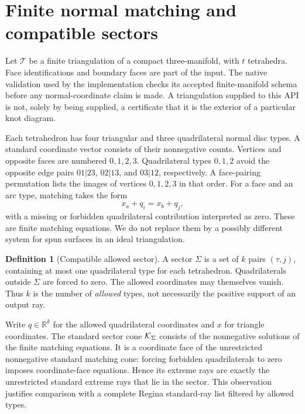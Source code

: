 \documentclass[11pt]{article}
\theoremstyle{definition}
\newtheorem{definition}[theorem]{Definition}
\theoremstyle{remark}
\newcommand{\R}{\mathbb R}\newcommand{\Q}{\mathbb Q}
\begin{document}
\section{Finite normal matching and compatible sectors}
\label{sec:setting}

Let $\mathcal T$ be a finite triangulation of a compact three-manifold, with
$t$ tetrahedra. Face identifications and boundary faces are part of the input.
The native validation used by the implementation checks its accepted
finite-manifold schema before any normal-coordinate claim is made. A
triangulation supplied to this API is not, solely by being supplied, a
certificate that it is the exterior of a particular knot diagram.

Each tetrahedron has four triangular and three quadrilateral normal disc
types. A standard coordinate vector consists of their nonnegative counts.
Vertices and opposite faces are numbered $0,1,2,3$. Quadrilateral types
$0,1,2$ avoid the opposite edge pairs $01|23$, $02|13$, and $03|12$,
respectively. A face-pairing permutation lists the images of vertices
$0,1,2,3$ in that order.
For a face and an arc type, matching takes the form
\begin{equation}
 x_a+q_i=x_b+q_j,
 \label{eq:matching}
\end{equation}
with a missing or forbidden quadrilateral contribution interpreted as zero.
These are finite matching equations. We do not replace them by a possibly
different system for spun surfaces in an ideal triangulation.

\begin{definition}[Compatible allowed sector]
A sector $\Sigma$ is a set of $k$ pairs $(\tau,j)$, containing at most one
quadrilateral type for each tetrahedron. Quadrilaterals outside $\Sigma$ are
forced to zero. The allowed coordinates may themselves vanish. Thus $k$ is
the number of \emph{allowed} types, not necessarily the positive support of
an output ray.
\end{definition}

Write $q\in\R^k$ for the allowed quadrilateral coordinates and $x$ for
triangle coordinates. The standard sector cone $\mathcal K_\Sigma$ consists of
the nonnegative solutions of the finite matching equations. It is a
coordinate face of the unrestricted nonnegative standard matching cone:
forcing forbidden quadrilaterals to zero imposes coordinate-face equations.
Hence its extreme rays are exactly the unrestricted standard extreme rays
that lie in the sector. This observation justifies comparison with a complete
Regina standard-ray list filtered by allowed types.
\end{document}

